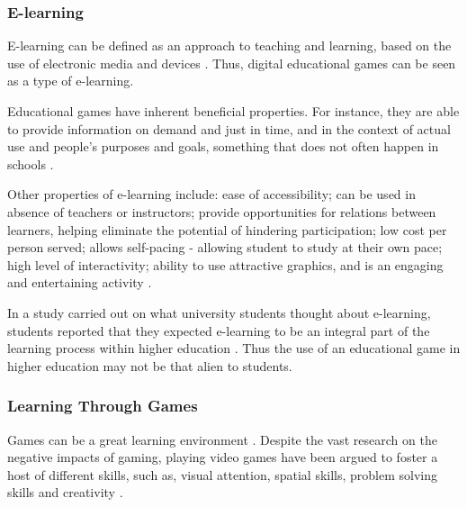 \documentclass[a4paper,11.5pt]{report}
\numberwithin{figure}{section}
\numberwithin{table}{section}
\numberwithin{equation}{section}
\numberwithin{equation}{section}
\begin{document}
\subsubsection{E-learning}

E-learning can be defined as an approach to teaching and learning, based on the use of electronic media and devices \citep{sangra2012}. Thus, digital educational games can be seen as a type of e-learning.

Educational games have inherent beneficial properties. For instance, they are able to provide information on demand and just in time, and in the context of actual use and people's purposes and goals, something that does not often happen in schools \citep{Gee2003}.

Other properties of e-learning include: ease of accessibility; can be used in absence of teachers or instructors; provide opportunities for relations between learners, helping eliminate the potential of hindering participation; low cost per person served; allows self-pacing - allowing student to study at their own pace; high level of interactivity; ability to use attractive graphics, and is an engaging and entertaining activity \citep{arkorful2015, Girard2013}.

In a study carried out on what university students thought about e-learning, students reported that they expected e-learning to be an integral part of the learning process within higher education \citep{Connolly2012}. Thus the use of an educational game in higher education may not be that alien to students.



\subsubsection{Learning Through Games}


Games can be a great learning environment \citep[see][]{prensky2003, Gee2003}. Despite the vast research on the negative impacts of gaming, playing video games have been argued to foster a host of different skills, such as, visual attention, spatial skills, problem solving skills and creativity \citep{Granic2014}. 
\end{document}
